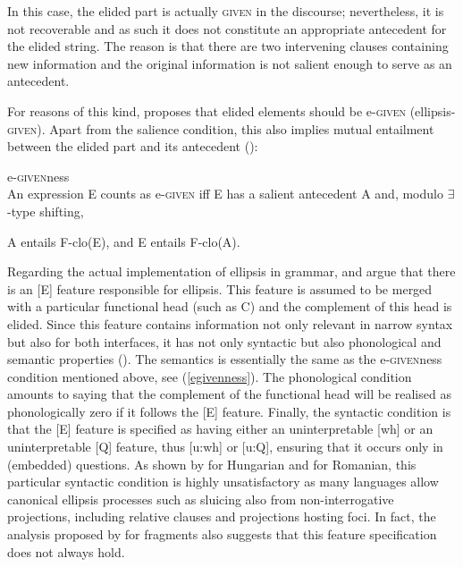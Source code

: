 In this case, the elided part is actually \textsc{given} in the discourse; nevertheless, it is not recoverable and as such it does not constitute an appropriate antecedent for the elided string. The reason is that there are two intervening clauses containing new information and the original information is not salient enough to serve as an antecedent.

For reasons of this kind, \citet[25--36]{merchant2001} proposes that elided elements should be e-\textsc{given} (ellipsis-\textsc{given}). Apart from the salience condition, this also implies mutual entailment between the elided part and its antecedent (\citealt[26, ex. 42]{merchant2001}):

\begin{exe}
\ex e-\textsc{given}ness\\
An expression E counts as e-\textsc{given} iff E has a salient antecedent A and, modulo $\exists$-type shifting, \label{egivenness}
\begin{xlist} 
 A entails F-clo(E), and
 E entails F-clo(A).
\end{xlist}
\end{exe}

Regarding the actual implementation of ellipsis in grammar, \citet[55--61]{merchant2001} and \citet[670--673]{merchant2004} argue that there is an [E] feature responsible for ellipsis. This feature is assumed to be merged with a particular functional head (such as C) and the complement of this head is elided. Since this feature contains information not only relevant in narrow syntax but also for both interfaces, it has not only syntactic but also phonological and semantic properties (\citealt[670--673]{merchant2004}). The semantics is essentially the same as the e-\textsc{given}ness condition mentioned above, see (\ref{egivenness}). The phonological condition amounts to saying that the complement of the functional head will be realised as phonologically zero if it follows the [E] feature. Finally, the syntactic condition is that the [E] feature is specified as having either an uninterpretable [wh] or an uninterpretable [Q] feature, thus [u:wh] or [u:Q], ensuring that it occurs only in (embedded) questions. As shown by \citet{vancraenenbroeckliptak2006} for Hungarian and \citet{hoytteodorescu2012} for Romanian, this particular syntactic condition is highly unsatisfactory as many languages allow canonical ellipsis processes such as sluicing also from non-interrogative projections, including relative clauses and projections hosting foci. In fact, the analysis proposed by \citet{merchant2004} for fragments also suggests that this feature specification does not always hold.

